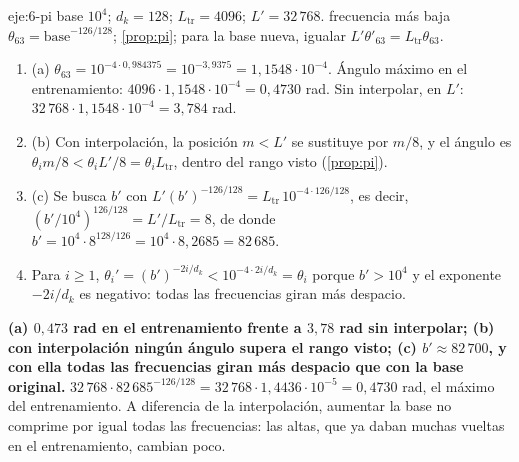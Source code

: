 \begin{solucion}{eje:6-pi}
\datos base $10^{4}$; $d_k=128$; $L_{\mathrm{tr}}=4096$; $L'=32\,768$.
\planteamiento frecuencia más baja $\theta_{63}=\text{base}^{-126/128}$; \cref{prop:pi}; para la base nueva, igualar $L'\theta'_{63}=L_{\mathrm{tr}}\theta_{63}$.
\pasos
\begin{enumerate}[label=\arabic*.]
  \item (a) $\theta_{63}=10^{-4\cdot 0{,}984375}=10^{-3{,}9375}=1{,}1548\cdot 10^{-4}$. Ángulo máximo en el entrenamiento: $4096\cdot 1{,}1548\cdot 10^{-4}=0{,}4730$ rad. Sin interpolar, en $L'$: $32\,768\cdot 1{,}1548\cdot 10^{-4}=3{,}784$ rad.
  \item (b) Con interpolación, la posición $m<L'$ se sustituye por $m/8$, y el ángulo es $\theta_i m/8<\theta_iL'/8=\theta_iL_{\mathrm{tr}}$, dentro del rango visto (\cref{prop:pi}).
  \item (c) Se busca $b'$ con $L'(b')^{-126/128}=L_{\mathrm{tr}}\,10^{-4\cdot 126/128}$, es decir, $(b'/10^{4})^{126/128}=L'/L_{\mathrm{tr}}=8$, de donde $b'=10^{4}\cdot 8^{128/126}=10^{4}\cdot 8{,}2685=82\,685$.
  \item Para $i\ge 1$, $\theta_i'=(b')^{-2i/d_k}<10^{-4\cdot 2i/d_k}=\theta_i$ porque $b'>10^{4}$ y el exponente $-2i/d_k$ es negativo: todas las frecuencias giran más despacio.
\end{enumerate}
\resultado \textbf{(a) $0{,}473$ rad en el entrenamiento frente a $3{,}78$ rad sin interpolar; (b) con interpolación ningún ángulo supera el rango visto; (c) $b'\approx 82\,700$, y con ella todas las frecuencias giran más despacio que con la base original.}
\comprobacion $32\,768\cdot 82\,685^{-126/128}=32\,768\cdot 1{,}4436\cdot 10^{-5}=0{,}4730$ rad, el máximo del entrenamiento. A diferencia de la interpolación, aumentar la base no comprime por igual todas las frecuencias: las altas, que ya daban muchas vueltas en el entrenamiento, cambian poco.
\end{solucion}
